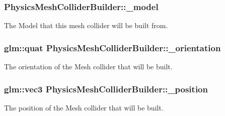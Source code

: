 \subsubsection[{\texorpdfstring{\+\_\+model}{_model}}]{ Physics\+Mesh\+Collider\+Builder\+::\+\_\+model\hspace{0.3cm}{\ttfamily [private]}}\hypertarget{classPhysicsMeshColliderBuilder_a41bb17e3b830ef92b2f04d500a25a829}{}\label{classPhysicsMeshColliderBuilder_a41bb17e3b830ef92b2f04d500a25a829}
The Model that this mesh collider will be built from. 
\subsubsection[{\texorpdfstring{\+\_\+orientation}{_orientation}}]{\setlength{\rightskip}{0pt plus 5cm}glm\+::quat Physics\+Mesh\+Collider\+Builder\+::\+\_\+orientation\hspace{0.3cm}{\ttfamily [private]}}\hypertarget{classPhysicsMeshColliderBuilder_a443158e70fca5a8df35e90b99e75c6b9}{}\label{classPhysicsMeshColliderBuilder_a443158e70fca5a8df35e90b99e75c6b9}
The orientation of the Mesh collider that will be built. 
\subsubsection[{\texorpdfstring{\+\_\+position}{_position}}]{\setlength{\rightskip}{0pt plus 5cm}glm\+::vec3 Physics\+Mesh\+Collider\+Builder\+::\+\_\+position\hspace{0.3cm}{\ttfamily [private]}}\hypertarget{classPhysicsMeshColliderBuilder_a1ed543ce75168fc3516a43095f375986}{}\label{classPhysicsMeshColliderBuilder_a1ed543ce75168fc3516a43095f375986}
The position of the Mesh collider that will be built. 
